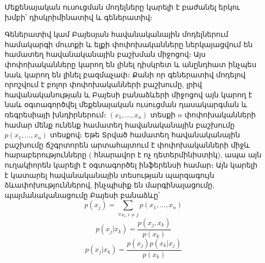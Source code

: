 \documentclass[11pt]{article}
\begin{document}
\par
Մեքենայական ուսուցման մոդելները կարելի է բաժանել երկու խմբի՝ դիսկրիմինատիվ և գեներատիվ։


Գեներատիվ կամ Բայեսյան հավանականային մոդելներում համակարգի մուտքի և ելքի փոփոխականները ներկայացվում են համատեղ հավանականային բաշխման միջոցով։ Այս փոփոխականները կարող են լինել դիսկրետ և անընդհատ ինչպես նաև կարող են լինել բազմաչափ։ Քանի որ գեներատիվ մոդելով որոշվում է բոլոր փոփոխականների բաշխումը, լրիվ  հավանականության և Բայեսի բանաձևերի միջոցով   այն կարող է նաև օգտագործվել մեքենայական ուսուցման դասակարգման և ռեգրեսիայի խնդիրներում։ $(x_1, ..., x_n)$ տեսքի $n$ փոփոխականների համար մենք ունենք համատեղ հավանականային բաշխումը $p(x_1, ..., x_n)$ տեսքով։ Եթե Տրված համատեղ հավանականային բաշխումը ճշգրտորեն արտահայտում է փոփոխականների միջև հարաբերությունները ( հնարավոր է ոչ դետերմինիստիկ), ապա այն ուղակիորեն կարելի է օգտագործել ինֆերենսի համար։  Այն կարելի է կատարել հավանականային տեսության պարզագույն ձևափոխություններով, ինչպիսիք են մարգինալացումը, պայմանականացումը Բայեսի բանաձևը՝
$$p(x_j) = \sum_{\forall x_i, i \neq j}{p(x_1, ..., x_n)}$$
$$p(x_j | x_k) = \frac {p(x_j, x_k)} {p(x_k)}$$
$$p(x_j | x_k) = \frac {p(x_j)p(x_k |x_j)} {p(x_k)}$$
\end{document}
